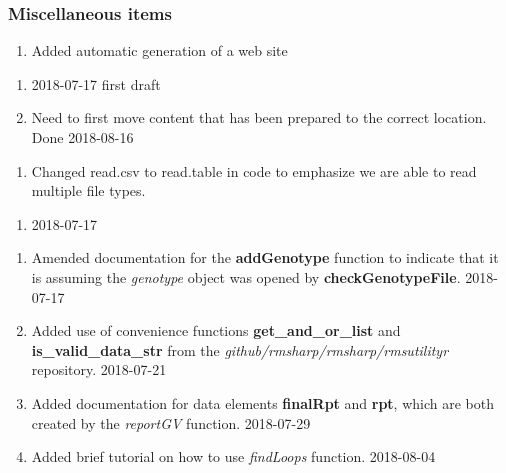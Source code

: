 \documentclass[
]{article}
\providecommand{\tightlist}{%
  \setlength{\itemsep}{0pt}\setlength{\parskip}{0pt}}
\begin{document}
\hypertarget{miscellaneous-items}{%
\subsubsection{Miscellaneous items}\label{miscellaneous-items}}

\begin{enumerate}
\def\labelenumi{\arabic{enumi}.}
\tightlist
\item
  Added automatic generation of a web site
\end{enumerate}

\begin{enumerate}
\def\labelenumi{\alph{enumi}.}
\tightlist
\item
  2018-07-17 first draft
\item
  Need to first move content that has been prepared to the correct
  location. Done 2018-08-16
\end{enumerate}

\begin{enumerate}
\def\labelenumi{\arabic{enumi}.}
\setcounter{enumi}{1}
\tightlist
\item
  Changed read.csv to read.table in code to emphasize we are able to
  read multiple file types.
\end{enumerate}

\begin{enumerate}
\def\labelenumi{\alph{enumi}.}
\tightlist
\item
  2018-07-17
\end{enumerate}

\begin{enumerate}
\def\labelenumi{\arabic{enumi}.}
\setcounter{enumi}{2}
\tightlist
\item
  Amended documentation for the \textbf{addGenotype} function to
  indicate that it is assuming the \emph{genotype} object was opened by
  \textbf{checkGenotypeFile}. 2018-07-17
\item
  Added use of convenience functions \textbf{get\_and\_or\_list} and
  \textbf{is\_valid\_data\_str} from the
  \emph{github/rmsharp/rmsharp/rmsutilityr} repository. 2018-07-21
\item
  Added documentation for data elements \textbf{finalRpt} and
  \textbf{rpt}, which are both created by the \emph{reportGV} function.
  2018-07-29
\item
  Added brief tutorial on how to use \emph{findLoops} function.
  2018-08-04
\end{enumerate}
\end{document}
